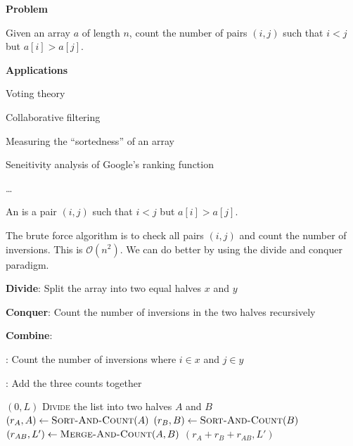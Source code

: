 \begin{listu}
    \item \textbf{Problem}
    
    Given an array $a$ of length $n$, count the number of pairs $(i, j)$ such that $i < j$ but $a[i] > a[j]$.

    \item \textbf{Applications}
    
    \begin{listu}
        \item Voting theory
        \item Collaborative filtering 
        \item Measuring the ``sortedness'' of an array
        \item Seneitivity analysis of Google's ranking function 
        \item \dots
    \end{listu}
\end{listu}

\begin{definition}[Inversion]\label{def:inversion}
    An  is a pair $(i, j)$ such that $i < j$ but $a[i] > a[j]$.
\end{definition}

The brute force algorithm is to check all pairs $(i, j)$ and count the number of inversions. This is $\mathcal{O}(n^2)$. We can do better by using the divide and conquer paradigm.

\begin{listu}
    \item \textbf{Divide}: Split the array into two equal halves $x$ and $y$
    \item \textbf{Conquer}: Count the number of inversions in the two halves recursively
    \item \textbf{Combine}:
    \begin{listu}
        \item {}: Count the number of inversions where $i \in x$ and $j \in y$
        \item {}: Add the three counts together
    \end{listu}
\end{listu}

\begin{algorithm}    
    \begin{algorithmic}[1]
                \State \Return $(0, L)$
            \EndIf
            \State
            \State \textsc{\color{primary}Divide} the list into two halves $A$ and $B$
            \State $(r_A, A) \gets \Call{Sort-And-Count}{A}$
            \State $(r_B, B) \gets \Call{Sort-And-Count}{B}$
            \State $(r_{AB}, L') \gets \Call{Merge-And-Count}{A, B}$
            \State
            \State \Return $(r_A + r_B + r_{AB}, L')$
        \EndFunction
    \end{algorithmic}
\end{algorithm}

